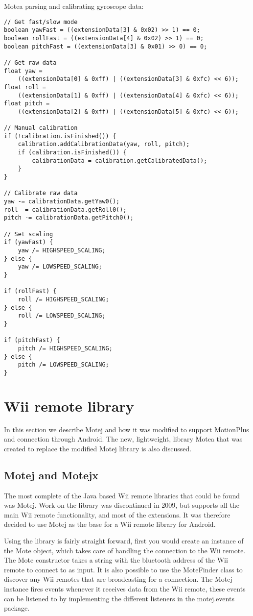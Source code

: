 Motea parsing and calibrating gyroscope data:
\begin{lstlisting}
// Get fast/slow mode
boolean yawFast = ((extensionData[3] & 0x02) >> 1) == 0;
boolean rollFast = ((extensionData[4] & 0x02) >> 1) == 0;
boolean pitchFast = ((extensionData[3] & 0x01) >> 0) == 0;

// Get raw data
float yaw = 
	((extensionData[0] & 0xff) | ((extensionData[3] & 0xfc) << 6));
float roll = 
	((extensionData[1] & 0xff) | ((extensionData[4] & 0xfc) << 6));
float pitch = 
	((extensionData[2] & 0xff) | ((extensionData[5] & 0xfc) << 6));

// Manual calibration
if (!calibration.isFinished()) {
	calibration.addCalibrationData(yaw, roll, pitch);
	if (calibration.isFinished()) {
		calibrationData = calibration.getCalibratedData();
	}
}

// Calibrate raw data
yaw -= calibrationData.getYaw0();
roll -= calibrationData.getRoll0();
pitch -= calibrationData.getPitch0();

// Set scaling
if (yawFast) {
	yaw /= HIGHSPEED_SCALING;
} else {
	yaw /= LOWSPEED_SCALING;
}

if (rollFast) {
	roll /= HIGHSPEED_SCALING;
} else {
	roll /= LOWSPEED_SCALING;
}

if (pitchFast) {
	pitch /= HIGHSPEED_SCALING;
} else {
	pitch /= LOWSPEED_SCALING;
}
\end{lstlisting}

\section{Wii remote library}
In this section we describe Motej and how it was modified to support MotionPlus and connection through Android. The new, lightweight, library Motea that was created to replace the modified Motej library is also discussed.

\subsection{Motej and Motejx}
The most complete of the Java based Wii remote libraries that could be found was Motej. Work on the library was discontinued in 2009, but supports all the main Wii remote functionality, and most of the extensions. It was therefore decided to use Motej as the base for a Wii remote library for Android. 

Using the library is fairly straight forward, first you would create an instance of the Mote object, which takes care of handling the connection to the Wii remote. The Mote constructor takes a string with the bluetooth address of the Wii remote to connect to as input. It is also possible to use the MoteFinder class to discover any Wii remotes that are broadcasting for a connection. The Motej instance fires events whenever it receives data from the Wii remote, these events can be listened to by implementing the different listeners in the motej.events package. 

